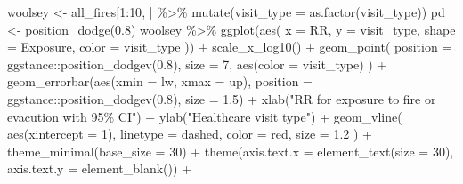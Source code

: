 \documentclass[
]{article}
\newenvironment{Shaded}{\begin{snugshade}}{\end{snugshade}}
\newcommand{\AttributeTok}[1]{\textcolor[rgb]{0.77,0.63,0.00}{#1}}
\newcommand{\DecValTok}[1]{\textcolor[rgb]{0.00,0.00,0.81}{#1}}
\newcommand{\FloatTok}[1]{\textcolor[rgb]{0.00,0.00,0.81}{#1}}
\newcommand{\FunctionTok}[1]{\textcolor[rgb]{0.00,0.00,0.00}{#1}}
\newcommand{\NormalTok}[1]{#1}
\newcommand{\OtherTok}[1]{\textcolor[rgb]{0.56,0.35,0.01}{#1}}
\newcommand{\SpecialCharTok}[1]{\textcolor[rgb]{0.00,0.00,0.00}{#1}}
\newcommand{\StringTok}[1]{\textcolor[rgb]{0.31,0.60,0.02}{#1}}
\begin{document}
\begin{Shaded}
\begin{Highlighting}[]
\NormalTok{woolsey }\OtherTok{\textless{}{-}}
\NormalTok{  all\_fires[}\DecValTok{1}\SpecialCharTok{:}\DecValTok{10}\NormalTok{, ] }\SpecialCharTok{\%\textgreater{}\%} \FunctionTok{mutate}\NormalTok{(}\AttributeTok{visit\_type =} \FunctionTok{as.factor}\NormalTok{(visit\_type))}
\NormalTok{pd }\OtherTok{\textless{}{-}} \FunctionTok{position\_dodge}\NormalTok{(}\FloatTok{0.8}\NormalTok{)}
\NormalTok{woolsey }\SpecialCharTok{\%\textgreater{}\%} \FunctionTok{ggplot}\NormalTok{(}\FunctionTok{aes}\NormalTok{(}
  \AttributeTok{x =}\NormalTok{ RR,}
  \AttributeTok{y =}\NormalTok{ visit\_type,}
  \AttributeTok{shape =}\NormalTok{ Exposure,}
  \AttributeTok{color =}\NormalTok{ visit\_type}
\NormalTok{)) }\SpecialCharTok{+}
  \FunctionTok{scale\_x\_log10}\NormalTok{() }\SpecialCharTok{+}
  \FunctionTok{geom\_point}\NormalTok{(}
    \AttributeTok{position =}\NormalTok{ ggstance}\SpecialCharTok{::}\FunctionTok{position\_dodgev}\NormalTok{(}\FloatTok{0.8}\NormalTok{),}
    \AttributeTok{size =} \DecValTok{7}\NormalTok{,}
    \FunctionTok{aes}\NormalTok{(}\AttributeTok{color =}\NormalTok{ visit\_type)}
\NormalTok{  ) }\SpecialCharTok{+}
  \FunctionTok{geom\_errorbar}\NormalTok{(}\FunctionTok{aes}\NormalTok{(}\AttributeTok{xmin =}\NormalTok{ lw, }\AttributeTok{xmax =}\NormalTok{ up),}
                \AttributeTok{position =}\NormalTok{ ggstance}\SpecialCharTok{::}\FunctionTok{position\_dodgev}\NormalTok{(}\FloatTok{0.8}\NormalTok{),}
                \AttributeTok{size =} \FloatTok{1.5}\NormalTok{) }\SpecialCharTok{+}
  \FunctionTok{xlab}\NormalTok{(}\StringTok{"RR for exposure to fire or evacution with 95\% CI"}\NormalTok{) }\SpecialCharTok{+}
  \FunctionTok{ylab}\NormalTok{(}\StringTok{"Healthcare visit type"}\NormalTok{) }\SpecialCharTok{+}
  \FunctionTok{geom\_vline}\NormalTok{(}
    \FunctionTok{aes}\NormalTok{(}\AttributeTok{xintercept =} \DecValTok{1}\NormalTok{),}
    \AttributeTok{linetype =} \StringTok{\textquotesingle{}dashed\textquotesingle{}}\NormalTok{,}
    \AttributeTok{color =} \StringTok{\textquotesingle{}red\textquotesingle{}}\NormalTok{,}
    \AttributeTok{size =} \FloatTok{1.2}
\NormalTok{  ) }\SpecialCharTok{+}
  \FunctionTok{theme\_minimal}\NormalTok{(}\AttributeTok{base\_size =} \DecValTok{30}\NormalTok{) }\SpecialCharTok{+}
  \FunctionTok{theme}\NormalTok{(}\AttributeTok{axis.text.x =} \FunctionTok{element\_text}\NormalTok{(}\AttributeTok{size =} \DecValTok{30}\NormalTok{),}
        \AttributeTok{axis.text.y =} \FunctionTok{element\_blank}\NormalTok{()) }\SpecialCharTok{+}
  

\end{Highlighting}
\end{Shaded}
\end{document}
